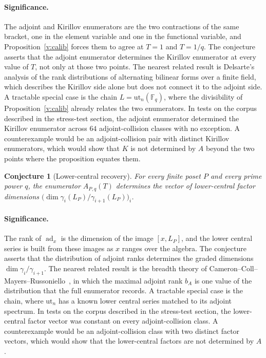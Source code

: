 \documentclass[11pt]{article}
\newtheorem{conjecture}{Conjecture}
\theoremstyle{definition}
\newcommand{\Fq}{\mathbb F}
\begin{document}
\paragraph{Significance.}
The adjoint and Kirillov enumerators are the two contractions of the same bracket, one in the element variable and one in the functional variable, and Proposition~\ref{v:calib} forces them to agree at $T=1$ and $T=1/q$.  The conjecture asserts that the adjoint enumerator determines the Kirillov enumerator at every value of $T$, not only at those two points.  The nearest related result is Delsarte's~\cite{Del} analysis of the rank distributions of alternating bilinear forms over a finite field, which describes the Kirillov side alone but does not connect it to the adjoint side.  A tractable special case is the chain $L=\mathrm{ut}_n(\Fq_q)$, where the divisibility of Proposition~\ref{v:calib} already relates the two enumerators.  In tests on the corpus described in the stress-test section, the adjoint enumerator determined the Kirillov enumerator across $64$ adjoint-collision classes with no exception.  A counterexample would be an adjoint-collision pair with distinct Kirillov enumerators, which would show that $K$ is not determined by $A$ beyond the two points where the proposition equates them.

\begin{conjecture}[Lower-central recovery]\label{v2}
For every finite poset $P$ and every prime power $q$, the enumerator $A_{P,q}(T)$ determines the vector of lower-central factor dimensions $\bigl(\dim\gamma_i(L_P)/\gamma_{i+1}(L_P)\bigr)_i$.
\end{conjecture}

\paragraph{Significance.}
The rank of $\operatorname{ad}_x$ is the dimension of the image $[x,L_P]$, and the lower central series is built from these images as $x$ ranges over the algebra.  The conjecture asserts that the distribution of adjoint ranks determines the graded dimensions $\dim\gamma_i/\gamma_{i+1}$.  The nearest related result is the breadth theory of Cameron--Coll--Mayers--Russoniello~\cite{CCMR}, in which the maximal adjoint rank $b_A$ is one value of the distribution that the full enumerator records.  A tractable special case is the chain, where $\mathrm{ut}_n$ has a known lower central series matched to its adjoint spectrum.  In tests on the corpus described in the stress-test section, the lower-central factor vector was constant on every adjoint-collision class.  A counterexample would be an adjoint-collision class with two distinct factor vectors, which would show that the lower-central factors are not determined by $A$.
\end{document}
